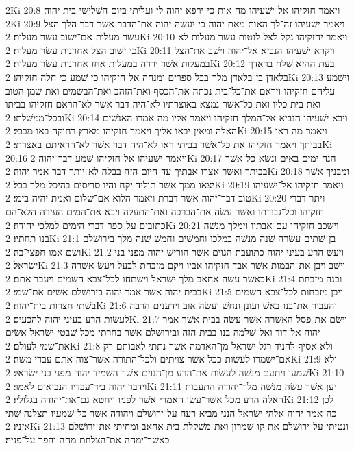 2Ki 20:8  ויאמר חזקיהו אל־ישׁעיהו מה אות כי־ירפא יהוה לי ועליתי ביום השׁלישׁי בית יהוה׃
2Ki 20:9  ויאמר ישׁעיהו זה־לך האות מאת יהוה כי יעשׂה יהוה את־הדבר אשׁר דבר הלך הצל עשׂר מעלות אם־ישׁוב עשׂר מעלות׃
2Ki 20:10  ויאמר יחזקיהו נקל לצל לנטות עשׂר מעלות לא כי ישׁוב הצל אחרנית עשׂר מעלות׃
2Ki 20:11  ויקרא ישׁעיהו הנביא אל־יהוה וישׁב את־הצל במעלות אשׁר ירדה במעלות אחז אחרנית עשׂר מעלות׃
2Ki 20:12  בעת ההיא שׁלח בראדך בלאדן בן־בלאדן מלך־בבל ספרים ומנחה אל־חזקיהו כי שׁמע כי חלה חזקיהו׃
2Ki 20:13  וישׁמע עליהם חזקיהו ויראם את־כל־בית נכתה את־הכסף ואת־הזהב ואת־הבשׂמים ואת שׁמן הטוב ואת בית כליו ואת כל־אשׁר נמצא באוצרתיו לא־היה דבר אשׁר לא־הראם חזקיהו בביתו ובכל־ממשׁלתו׃
2Ki 20:14  ויבא ישׁעיהו הנביא אל־המלך חזקיהו ויאמר אליו מה אמרו האנשׁים האלה ומאין יבאו אליך ויאמר חזקיהו מארץ רחוקה באו מבבל׃
2Ki 20:15  ויאמר מה ראו בביתך ויאמר חזקיהו את כל־אשׁר בביתי ראו לא־היה דבר אשׁר לא־הראיתם באצרתי׃
2Ki 20:16  ויאמר ישׁעיהו אל־חזקיהו שׁמע דבר־יהוה׃
2Ki 20:17  הנה ימים באים ונשׂא כל־אשׁר בביתך ואשׁר אצרו אבתיך עד־היום הזה בבלה לא־יותר דבר אמר יהוה׃
2Ki 20:18  ומבניך אשׁר יצאו ממך אשׁר תוליד יקח והיו סריסים בהיכל מלך בבל׃
2Ki 20:19  ויאמר חזקיהו אל־ישׁעיהו טוב דבר־יהוה אשׁר דברת ויאמר הלוא אם־שׁלום ואמת יהיה בימי׃
2Ki 20:20  ויתר דברי חזקיהו וכל־גבורתו ואשׁר עשׂה את־הברכה ואת־התעלה ויבא את־המים העירה הלא־הם כתובים על־ספר דברי הימים למלכי יהודה׃
2Ki 20:21  וישׁכב חזקיהו עם־אבתיו וימלך מנשׁה בנו תחתיו׃
2Ki 21:1  בן־שׁתים עשׂרה שׁנה מנשׁה במלכו וחמשׁים וחמשׁ שׁנה מלך בירושׁלם ושׁם אמו חפצי־בה׃
2Ki 21:2  ויעשׂ הרע בעיני יהוה כתועבת הגוים אשׁר הורישׁ יהוה מפני בני ישׂראל׃
2Ki 21:3  וישׁב ויבן את־הבמות אשׁר אבד חזקיהו אביו ויקם מזבחת לבעל ויעשׂ אשׁרה כאשׁר עשׂה אחאב מלך ישׂראל וישׁתחו לכל־צבא השׁמים ויעבד אתם׃
2Ki 21:4  ובנה מזבחת בבית יהוה אשׁר אמר יהוה בירושׁלם אשׂים את־שׁמי׃
2Ki 21:5  ויבן מזבחות לכל־צבא השׁמים בשׁתי חצרות בית־יהוה׃
2Ki 21:6  והעביר את־בנו באשׁ ועונן ונחשׁ ועשׂה אוב וידענים הרבה לעשׂות הרע בעיני יהוה להכעיס׃
2Ki 21:7  וישׂם את־פסל האשׁרה אשׁר עשׂה בבית אשׁר אמר יהוה אל־דוד ואל־שׁלמה בנו בבית הזה ובירושׁלם אשׁר בחרתי מכל שׁבטי ישׂראל אשׂים את־שׁמי לעולם׃
2Ki 21:8  ולא אסיף להניד רגל ישׂראל מן־האדמה אשׁר נתתי לאבותם רק אם־ישׁמרו לעשׂות ככל אשׁר צויתים ולכל־התורה אשׁר־צוה אתם עבדי משׁה׃
2Ki 21:9  ולא שׁמעו ויתעם מנשׁה לעשׂות את־הרע מן־הגוים אשׁר השׁמיד יהוה מפני בני ישׂראל׃
2Ki 21:10  וידבר יהוה ביד־עבדיו הנביאים לאמר׃
2Ki 21:11  יען אשׁר עשׂה מנשׁה מלך־יהודה התעבות האלה הרע מכל אשׁר־עשׂו האמרי אשׁר לפניו ויחטא גם־את־יהודה בגלוליו׃
2Ki 21:12  לכן כה־אמר יהוה אלהי ישׂראל הנני מביא רעה על־ירושׁלם ויהודה אשׁר כל־שׁמעיו תצלנה שׁתי אזניו׃
2Ki 21:13  ונטיתי על־ירושׁלם את קו שׁמרון ואת־משׁקלת בית אחאב ומחיתי את־ירושׁלם כאשׁר־ימחה את־הצלחת מחה והפך על־פניה׃

